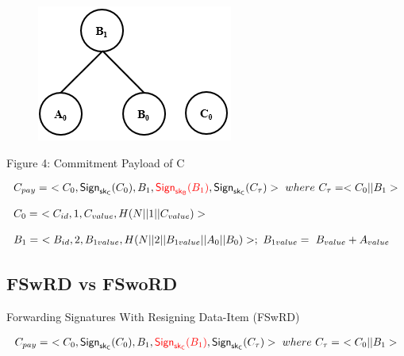 \documentclass[%
  slidesonly,%
  semlayer%
  ]{seminar}                                  %
\newcommand{\sk}{\sf{sk}}
\begin{document}
\begin{slide}
      \vfill
      \begin{figure}
        \centering
        \includegraphics[scale = 0.5]{images/commitment-payload-of-C.png}
      \end{figure}
      \begin{center}
        Figure 4: Commitment Payload of C
      \end{center}

      \begin{tiny}
        \begin{equation*}  
          \begin{array}{l}
            C_{pay} =\ <C_{0},\textsf{Sign}_{\sk_{C}}(C_{0}),B_{1},\textcolor{red}{\textsf{Sign}_{\sk_{B}}(B_{1})}, \textsf{Sign}_{\sk_{C}}(C_{\tau})>\ where\ C_{\tau} = <C_{0} || B_{1}>\\
      \\
            C_{0} =\ <C_{id}, 1, C_{value}, H(N||1||C_{value})>\\
      \\ 
            B_{1} =\ <B_{id}, 2, B_{1value}, H(N||2||B_{1value}||A_{0}||B_{0})>;\ B_{1value} =\ B_{value} + A_{value}
          \end{array}
        \end{equation*}
      \end{tiny}
      \vfill
      \clearpage

    \subsection*{FSwRD vs FSwoRD}
      \vfill
      Forwarding Signatures With Resigning Data-Item (FSwRD)
      
      \begin{tiny}
      \begin{equation*}  
        \begin{array}{l}
          C_{pay} =\ <C_{0},\textsf{Sign}_{\sk_{C}}(C_{0}),B_{1},\textcolor{red}{\textsf{Sign}_{\sk_{C}}(B_{1})}, \textsf{Sign}_{\sk_{C}}(C_{\tau})>\ where\ C_{\tau} =\ <C_{0} || B_{1}>\\
        \end{array}
      \end{equation*}
      \end{tiny}


\end{slide}
\end{document}
